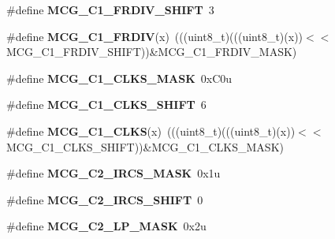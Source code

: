 \begin{DoxyCompactItemize}
\item 
\mbox{\label{group___m_c_g___register___masks_gaee124d0ce81f6e815dbbcac62440708b}} 
\#define {\bfseries M\+C\+G\+\_\+\+C1\+\_\+\+F\+R\+D\+I\+V\+\_\+\+S\+H\+I\+FT}~3
\item 
\mbox{\label{group___m_c_g___register___masks_ga39519f6e6a3b433988eca107d0e7d460}} 
\#define {\bfseries M\+C\+G\+\_\+\+C1\+\_\+\+F\+R\+D\+IV}(x)~(((uint8\+\_\+t)(((uint8\+\_\+t)(x))$<$$<$M\+C\+G\+\_\+\+C1\+\_\+\+F\+R\+D\+I\+V\+\_\+\+S\+H\+I\+FT))\&M\+C\+G\+\_\+\+C1\+\_\+\+F\+R\+D\+I\+V\+\_\+\+M\+A\+SK)
\item 
\mbox{\label{group___m_c_g___register___masks_gae9a1db29d56ef219e4df3dc9d945b08e}} 
\#define {\bfseries M\+C\+G\+\_\+\+C1\+\_\+\+C\+L\+K\+S\+\_\+\+M\+A\+SK}~0x\+C0u
\item 
\mbox{\label{group___m_c_g___register___masks_ga9ca1068f336097a94984ba4bba0798d6}} 
\#define {\bfseries M\+C\+G\+\_\+\+C1\+\_\+\+C\+L\+K\+S\+\_\+\+S\+H\+I\+FT}~6
\item 
\mbox{\label{group___m_c_g___register___masks_gaffe61ac58c90dfaebbd4748c0dea558c}} 
\#define {\bfseries M\+C\+G\+\_\+\+C1\+\_\+\+C\+L\+KS}(x)~(((uint8\+\_\+t)(((uint8\+\_\+t)(x))$<$$<$M\+C\+G\+\_\+\+C1\+\_\+\+C\+L\+K\+S\+\_\+\+S\+H\+I\+FT))\&M\+C\+G\+\_\+\+C1\+\_\+\+C\+L\+K\+S\+\_\+\+M\+A\+SK)
\item 
\mbox{\label{group___m_c_g___register___masks_gaef3ef9fc35df3b7d404dd2b7279051cb}} 
\#define {\bfseries M\+C\+G\+\_\+\+C2\+\_\+\+I\+R\+C\+S\+\_\+\+M\+A\+SK}~0x1u
\item 
\mbox{\label{group___m_c_g___register___masks_ga9a364696151f81b7a671bafd25cf16d1}} 
\#define {\bfseries M\+C\+G\+\_\+\+C2\+\_\+\+I\+R\+C\+S\+\_\+\+S\+H\+I\+FT}~0
\item 
\mbox{\label{group___m_c_g___register___masks_ga204f588f13f46a9ae20bc7aecfdf4f37}} 
\#define {\bfseries M\+C\+G\+\_\+\+C2\+\_\+\+L\+P\+\_\+\+M\+A\+SK}~0x2u
\item 

\end{DoxyCompactItemize}
